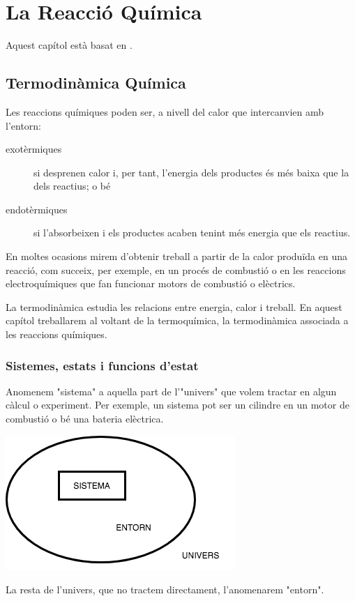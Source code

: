 \chapter{La Reacció Química}

Aquest capítol està basat en \cite{caamano_ros_quimica_1991,yen_chemistry_2008,dickerson_principios_1993}.

\section{Termodinàmica Química}

Les reaccions químiques poden ser, a nivell del calor que intercanvien amb l'entorn:
\begin{description}
\item[exotèrmiques] si desprenen calor i, per tant, l'energia dels productes és més baixa que la dels reactius; o bé
\item[endotèrmiques] si l'absorbeixen i els productes acaben tenint més energia que els reactius.
\end{description}

En moltes ocasions mirem d'obtenir treball a partir de la calor produïda en una reacció, com succeix, per exemple, en un procés de combustió o en les reaccions electroquímiques que fan funcionar motors de combustió o elèctrics.

La termodinàmica estudia les relacions entre energia, calor i treball.
En aquest capítol treballarem al voltant de la termoquímica, la termodinàmica associada a les reaccions químiques. 


\subsection{Sistemes, estats i funcions d'estat}

Anomenem "sistema" a aquella part de l'"univers" que volem tractar en algun càlcul o experiment. 
Per exemple, un sistema pot ser un cilindre en un motor de combustió o bé una bateria elèctrica.
\begin{center}
\includegraphics[scale=1.0]{figures/SistEntornUnivers.png}
\end{center}
La resta de l'univers, que no tractem directament, l'anomenarem "entorn".

